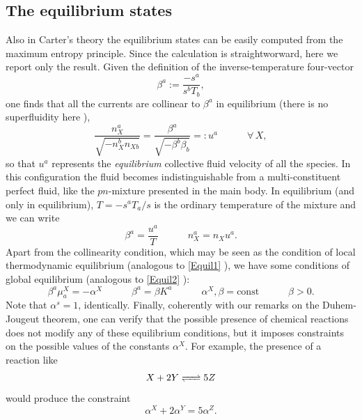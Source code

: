 \documentclass[a4paper, amsfonts, amssymb, amsmath, reprint, showkeys, nofootinbib, twoside, onecolumn,notitlepage]{revtex4-1}
\newcommand{\spc}{\quad \quad \quad}
\begin{document}
\subsection{The equilibrium states}

Also in Carter's theory the equilibrium states can be easily computed from the maximum entropy principle. Since the calculation is straightworward, here we report only the result. Given the definition of the inverse-temperature four-vector 
\begin{equation}
\beta^a := \dfrac{-s^a}{s^b T_b},
\end{equation}
one finds that all the currents are collinear to $\beta^a$ in equilibrium (there is no superfluidity here \cite{Termo}),
\begin{equation}
\dfrac{n_X^a}{\sqrt{-n_X^b n_{Xb}}} = \dfrac{\beta^a}{\sqrt{-\beta^b \beta_b}} =:u^a  \spc \forall \, X,
\end{equation}
so that $u^a$ represents the \textit{equilibrium} collective fluid velocity of all the species. In this configuration the fluid becomes indistinguishable from a multi-constituent perfect fluid, like the $pn$-mixture presented in the main body. In equilibrium (and only in equilibrium), $T=-s^a T_a/s$ is the ordinary temperature of the mixture and we can write   
\begin{equation}\label{Equil1Carter}
\beta^a = \dfrac{u^a}{T}  \spc n_X^a = n_X u^a.
\end{equation}
Apart from the collinearity condition, which may be seen as the condition of local thermodynamic equilibrium (analogous to \eqref{Equil1} ), we have some conditions of global equilibrium (analogous to \eqref{Equil2} ):
\begin{equation}\label{Equil2Carter}
\beta^a \mu^X_a = -\alpha^X  \spc  \beta^a = \beta K^a  \spc \alpha^X ,\beta=\text{const}  \spc  \beta>0.
\end{equation}
Note that $\alpha^s=1$, identically. Finally, coherently with our remarks on the Duhem-Jougeut theorem, one can verify that the possible presence of chemical reactions does not modify any of these equilibrium conditions, but it imposes constraints on the possible values of the constants $\alpha^X$. For example, the presence of a reaction like
\begin{equation}
X +2Y \ce{ <=> } 5Z
\end{equation}
would produce the constraint
\begin{equation}\label{equilireactzio}
\alpha^X + 2 \alpha^Y = 5 \alpha^Z.
\end{equation} 
\end{document}

